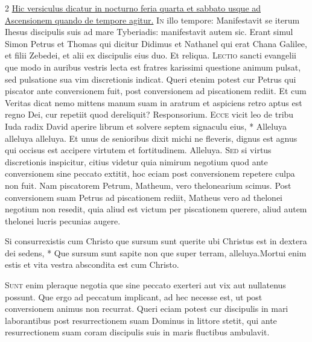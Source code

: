 \begin{multicols*}{2}
\newline \ul{Hic versiculus dicatur in nocturno feria quarta et sabbato usque ad Ascensionem quando de tempore agitur.}
\lettrine[lines=2]{\zallmancaps \color{Blue} I}{n} illo tempore: Manifestavit se iterum Ihesus discipulis suis ad mare Tyberiadis: manifestavit autem sic. Erant simul Simon Petrus et Thomas qui dicitur Didimus et Nathanel qui erat Chana Galilee, et filii Zebedei, et alii ex discipulis eius duo. Et reliqua.
\lettrine[lines=2]{\zallmancaps \color{Red} L}{ectio} sancti evangelii que modo in auribus vestris lecta est fratres karissimi questione animum pulsat, sed pulsatione sua vim discretionis indicat. Queri etenim potest cur Petrus qui piscator ante conversionem fuit, post conversionem ad piscationem rediit. Et cum Veritas dicat nemo mittens manum suam in aratrum et aspiciens retro aptus est regno Dei, cur repetiit quod dereliquit? {\color{Red} Responsorium.}
\lettrine[lines=2]{\zallmancaps \color{Blue} E}{cce} \hypertarget{ecce-vicit-leo}{\label{ecce-vicit-leo}} vicit leo de tribu Iuda radix David aperire librum et solvere septem signaculu eius, * Alleluya alleluya alleluya. \V Et unus de senioribus dixit michi ne fleveris, dignus est agnus qui occisus est accipere virtutem et fortitudinem. Alleluya.
\lettrine[lines=2]{\zallmancaps \color{Red} S}{ed} si virtus discretionis inspicitur, citius videtur quia nimirum negotium quod ante conversionem sine peccato extitit, hoc eciam post conversionem repetere culpa non fuit. Nam piscatorem Petrum, Matheum, vero thelonearium scimus. Post conversionem suam Petrus ad piscationem rediit, Matheus vero ad thelonei negotium non resedit, quia aliud est victum per piscationem querere, aliud autem thelonei lucris pecunias augere.
\begin{responsory}[si-consurrexistis]
{Si consurrexistis cum Christo que sursum sunt querite ubi Christus est in dextera dei sedens, * Que sursum sunt sapite non que super terram, alleluya.}{Mortui enim estis et vita vestra abscondita est cum Christo.}
\end{responsory}%
\lettrine[lines=2]{\zallmancaps \color{Blue} S}{unt} enim pleraque negotia que sine peccato exerteri aut vix aut nullatenus possunt. Que ergo ad peccatum implicant, ad hec necesse est, ut post conversionem animus non recurrat. Queri eciam potest cur discipulis in mari laborantibus post resurrectionem suam Dominus in littore stetit, qui ante resurrectionem suam coram discipulis suis in maris fluctibus ambulavit.

\end{multicols*}
